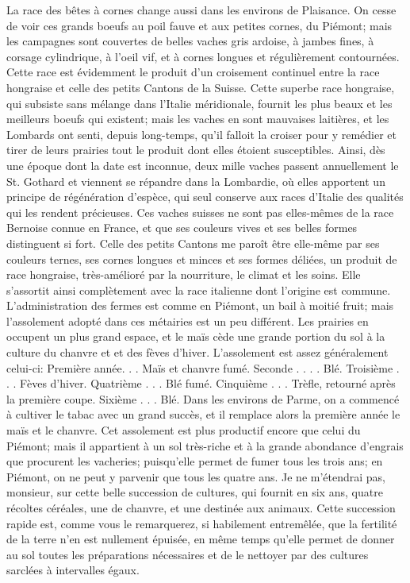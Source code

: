 La race des bêtes à cornes change aussi dans les environs de Plaisance. On cesse de voir ces grands boeufs au poil fauve et aux petites cornes, du Piémont; mais les campagnes sont couvertes de belles vaches gris ardoise, à jambes fines, à corsage cylindrique, à l'oeil vif, et à cornes longues et régulièrement contournées. Cette race est évidemment le produit d'un croisement continuel entre la race hongraise et celle des petits Cantons de la Suisse.
Cette superbe race hongraise, qui subsiste sans mélange dans l'Italie méridionale, fournit les plus beaux et les meilleurs boeufs qui existent; mais les vaches en sont mauvaises laitières, et les Lombards ont senti, depuis long-temps, qu'il falloit la croiser pour y remédier et tirer de leurs prairies tout le produit dont elles étoient susceptibles. Ainsi, dès une époque dont la date est inconnue, deux mille vaches passent annuellement le St. Gothard et viennent se répandre dans la Lombardie, où elles apportent un principe de régénération d'espèce, qui seul conserve aux races d'Italie des qualités qui les rendent précieuses.
\setcounter{page}{439} Ces vaches suisses ne sont pas elles-mêmes de la race Bernoise connue en France, et que ses couleurs vives et ses belles formes distinguent si fort. Celle des petits Cantons me paroît être elle-même par ses couleurs ternes, ses cornes longues et minces et ses formes déliées, un produit de race hongraise, très-amélioré par la nourriture, le climat et les soins. Elle s'assortit ainsi complètement avec la race italienne dont l'origine est commune.
L'administration des fermes est comme en Piémont, un bail à moitié fruit; mais l'assolement adopté dans ces métairies est un peu différent. Les prairies en occupent un plus grand espace, et le maïs cède une grande portion du sol à la culture du chanvre et et des fèves d'hiver. L'assolement est assez généralement celui-ci:
Première année. . . Maïs et chanvre fumé.
Seconde . . . . Blé.
Troisième . . . Fèves d'hiver.
Quatrième . . . Blé fumé.
Cinquième . . . Trèfle, retourné après la première coupe.
Sixième . . . Blé.
Dans les environs de Parme, on a commencé\setcounter{page}{440} à cultiver le tabac avec un grand succès, et il remplace alors la première année le maïs et le chanvre.
Cet assolement est plus productif encore que celui du Piémont; mais il appartient à un sol très-riche et à la grande abondance d’engrais que procurent les vacheries; puisqu’elle permet de fumer tous les trois ans; en Piémont, on ne peut y parvenir que tous les quatre ans.
Je ne m’étendrai pas, monsieur, sur cette belle succession de cultures, qui fournit en six ans, quatre récoltes céréales, une de chanvre, et une destinée aux animaux. Cette succession rapide est, comme vous le remarquerez, si habilement entremêlée, que la fertilité de la terre n’en est nullement épuisée, en même temps qu’elle permet de donner au sol toutes les préparations nécessaires et de le nettoyer par des cultures sarclées à intervalles égaux.
